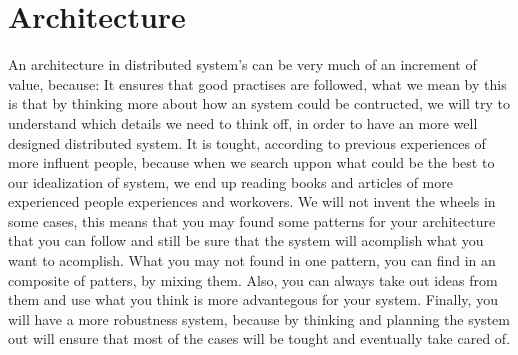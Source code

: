 \section{Architecture}
  An architecture in distributed system's can be very much of an increment of value, because:
  It ensures that good practises are followed, what we mean by this is that by thinking more about how an system could be contructed, we will try to understand which details we need to think off, in order to have an more well designed distributed system.
  It is tought, according to previous experiences of more influent people, because when we search uppon what could be the best to our idealization of system, we end up reading books and articles of more experienced people experiences and workovers.
  We will not invent the wheels in some cases, this means that you may found some patterns for your architecture that you can follow and still be sure that the system will acomplish what you want to acomplish. What you may not found in one pattern, you can find in an composite of patters, by mixing them. Also, you can always take out ideas from them and use what you think is more advantegous for your system.
  Finally, you will have a more robustness system, because by thinking and planning the system out will ensure that most of the cases will be tought and eventually take cared of.
  